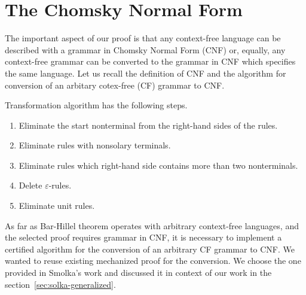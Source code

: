 \section{The Chomsky Normal Form}
\label{sec:cnf}

The important aspect of our proof is that any context-free language can be described with a grammar in Chomsky Normal Form (CNF) or, equally, any context-free grammar can be converted to the grammar in CNF which specifies the same language.
Let us recall the definition of CNF and the algorithm for conversion of an arbitary cotex-free (CF) grammar to CNF.

Transformation algorithm has the following steps.
\begin{enumerate}
\item Eliminate the start nonterminal from the right-hand sides of the rules.
\item Eliminate rules with nonsolary terminals.
\item Eliminate rules which right-hand side contains more than two nonterminals.
\item Delete $\varepsilon$-rules.
\item Eliminate unit rules.
\end{enumerate}

As far as Bar-Hillel theorem operates with arbitrary context-free languages, and the selected proof requires grammar in CNF, it is necessary to implement a certified algorithm for the conversion of an arbitrary CF grammar to CNF.
We wanted to reuse existing mechanized proof for the conversion.
We choose the one provided in Smolka's work and discussed it in context of our work in the section~\ref{sec:solka-generalized}.



